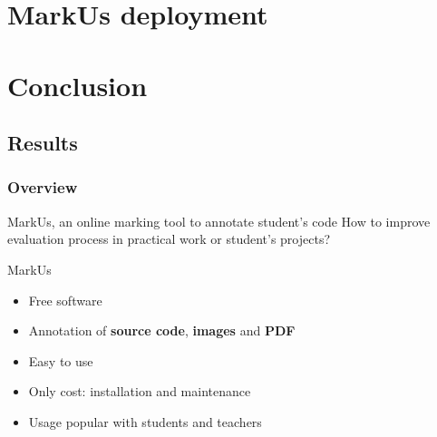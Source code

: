 \documentclass[svgnames,hyperref, english, xcolor=dvipsnames,usenames]{beamer}					      %
\begin{document}
\section{MarkUs deployment}



\section{Conclusion}


\subsection*{Results}

\frame
{
        \frametitle{Overview}

        \begin{alertblock}{MarkUs, an online marking tool to annotate student's code}
                How to improve evaluation process in practical work or student's projects?
        \end{alertblock}

        \begin{block}{MarkUs}
                \begin{itemize}
                        \item Free software
                        \item Annotation of \textbf{source code}, \textbf{images} and \textbf{PDF}
                        \item Easy to use
                        \item Only cost: installation and maintenance
                        \item Usage popular with students and teachers
                \end{itemize}
        \end{block}
}
\end{document}
